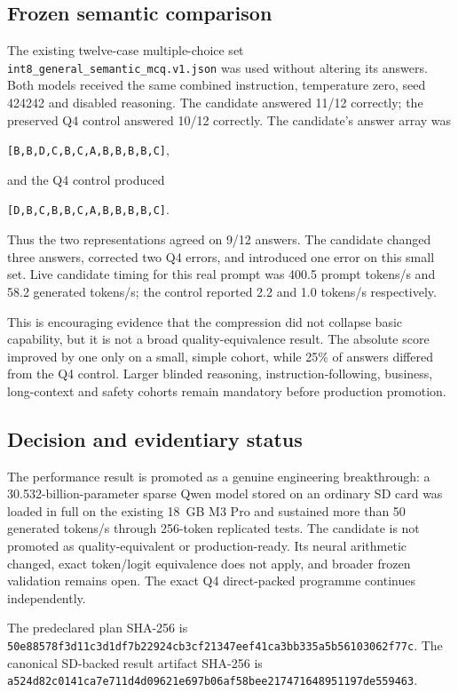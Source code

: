 \subsection{Frozen semantic comparison}

The existing twelve-case multiple-choice set
\texttt{int8\_general\_semantic\_mcq.v1.json} was used without altering its
answers.  Both models received the same combined instruction, temperature zero,
seed 424242 and disabled reasoning.  The candidate answered 11/12 correctly;
the preserved Q4 control answered 10/12 correctly.  The candidate's answer
array was
\begin{center}
\texttt{[B,B,D,C,B,C,A,B,B,B,B,C]},
\end{center}
and the Q4 control produced
\begin{center}
\texttt{[D,B,C,B,B,C,A,B,B,B,B,C]}.
\end{center}
Thus the two representations agreed on 9/12 answers.  The candidate changed
three answers, corrected two Q4 errors, and introduced one error on this small
set.  Live candidate timing for this real prompt was 400.5 prompt tokens/s and
58.2 generated tokens/s; the control reported 2.2 and 1.0 tokens/s respectively.

This is encouraging evidence that the compression did not collapse basic
capability, but it is not a broad quality-equivalence result.  The absolute score
improved by one only on a small, simple cohort, while 25\% of answers differed
from the Q4 control.  Larger blinded reasoning, instruction-following, business,
long-context and safety cohorts remain mandatory before production promotion.

\subsection{Decision and evidentiary status}

The performance result is promoted as a genuine engineering breakthrough: a
30.532-billion-parameter sparse Qwen model stored on an ordinary SD card was
loaded in full on the existing 18~GB M3 Pro and sustained more than 50 generated
tokens/s through 256-token replicated tests.  The candidate is not promoted as
quality-equivalent or production-ready.  Its neural arithmetic changed, exact
token/logit equivalence does not apply, and broader frozen validation remains
open.  The exact Q4 direct-packed programme continues independently.

The predeclared plan SHA-256 is
\texttt{50e88578f3d11c3d1df7b22924cb3cf21347eef41ca3bb335a5b56103062f77c}.
The canonical SD-backed result artifact SHA-256 is
\texttt{a524d82c0141ca7e711d4d09621e697b06af58bee217471648951197de559463}.

